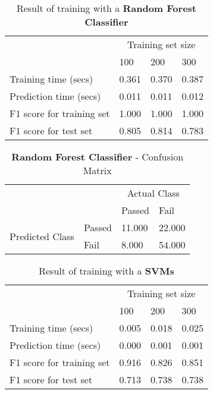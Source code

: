\documentclass[12pt]{article}
\begin{document}
\setlength{\extrarowheight}{1.5pt}
\begin{table}[!htbp]
\caption{Result of training with a \textbf{Random Forest Classifier}} %
\centering %
\begin{tabular}{|p{6cm}|p{1.5cm}|p{1.5cm}|p{1.5cm}|} %
\hline %
& \multicolumn{3}{c|}{Training set size}\\[5pt]
\cline{2-4} 
& 100 & 200 & 300\\[0.5ex]
\hline %

Training time (secs)   &       0.361 & 0.370 & 0.387 \\
Prediction time (secs)   &     0.011 & 0.011 & 0.012 \\
F1 score for training set  &   1.000 & 1.000 & 1.000 \\
F1 score for test set    &     0.805 & 0.814 & 0.783 \\
\hline %
\end{tabular}
\label{randomForestClassifierTable}
\end{table}

\setlength{\extrarowheight}{1.5pt}
\begin{table}[!htbp]
\caption{\textbf{Random Forest Classifier} - Confusion Matrix} %
\centering %
\begin{tabular}{ |l|l|p{3cm}|p{3cm}| }
\hline %
\multirow{2}{*}{} & & \multicolumn{2}{c|}{Actual Class} \\ 
\cline{3-4}
\multirow{2}{*}{} & & Passed & Fail \\ 
\hline
\multirow{2}{1.5in}{Predicted Class} & Passed & 11.000 & 22.000  \\ 
 & Fail & 8.000 & 54.000  \\ \hline
\end{tabular}
\end{table}

\setlength{\extrarowheight}{1.5pt}
\begin{table}[!htbp]
\caption{Result of training with a \textbf{SVMs}} %
\centering %
\begin{tabular}{|p{6cm}|p{1.5cm}|p{1.5cm}|p{1.5cm}|} %
\hline %
& \multicolumn{3}{c|}{Training set size}\\[5pt]
\cline{2-4} 
& 100 & 200 & 300\\[0.5ex]
\hline %

Training time (secs)   &       0.005 & 0.018 & 0.025 \\
Prediction time (secs)   &     0.000 & 0.001 & 0.001 \\
F1 score for training set  &   0.916 & 0.826 & 0.851 \\
F1 score for test set    &     0.713 & 0.738 & 0.738 \\
\hline %
\end{tabular}
\label{svmTable}
\end{table}
\end{document}
